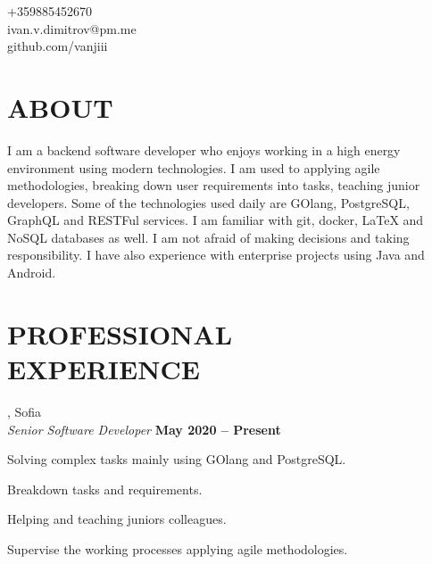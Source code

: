 \documentclass[margin,line]{resume}
\begin{document}
{
    \sc
    \hfill +359885452670		\vspace{0mm}\\\vspace{0mm}%
    \hfill ivan.v.dimitrov@pm.me        \vspace{0mm}\\\vspace{0mm}%
    \hfill github.com/vanjiii		\vspace{0mm}\\\vspace{-10mm}%
}

\begin{resume}
\vspace{1mm}

\section{\mysidestyle\textbf{\large{A}\small{BOUT}}}

    I am a backend software developer who enjoys working in a high
    energy environment using modern technologies. I am used to
    applying agile methodologies, breaking down user requirements into
    tasks, teaching junior developers. Some of the technologies used
    daily are GOlang, PostgreSQL, GraphQL and RESTFul services. I am
    familiar with git, docker, LaTeX and NoSQL databases as well. I am
    not afraid of making decisions and taking responsibility. I have
    also experience with enterprise projects using Java and Android.

\sectionline%

    \section{\mysidestyle\textbf{\large{P}\small{ROFESSIONAL\\EXPERIENCE}}}

    \textbf{}, Sofia \vspace{2mm}\\\vspace{1mm}%
    \textsl{Senior Software Developer} \hfill \textbf{May 2020 {--} Present}\\
    \begin{list2}
        \item Solving complex tasks mainly using GOlang and PostgreSQL.\@
        \item Breakdown tasks and requirements.
        \item Helping and teaching juniors colleagues.
	\item Supervise the working processes applying agile methodologies.
    \end{list2}


\end{resume}
\end{document}
